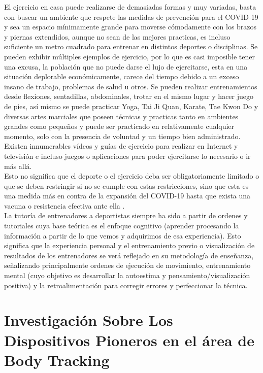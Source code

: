 El ejercicio en casa puede realizarse de demasiadas formas y muy variadas, basta con buscar un ambiente que respete las medidas de prevención para el COVID-19 y sea un espacio mínimamente grande para moverse cómodamente con los brazos y piernas extendidos, aunque no sean de las mejores practicas, es incluso suficiente un metro cuadrado para entrenar en distintos deportes o disciplinas. Se pueden exhibir múltiples ejemplos de ejercicio, por lo que es casi imposible tener una excusa, la población que no puede darse el lujo de ejercitarse, esta en una situación deplorable económicamente, carece del tiempo debido a un exceso insano de trabajo, problemas de salud u otros.
Se pueden realizar entrenamientos desde flexiones, sentadillas, abdominales, trotar en el mismo lugar y hacer juego de pies, así mismo se puede practicar Yoga, Tai Ji Quan, Karate, Tae Kwon Do y diversas artes marciales que poseen técnicas y practicas tanto en ambientes grandes como pequeños y puede ser practicado en relativamente cualquier momento, solo con la presencia de voluntad y un tiempo bien administrado. Existen innumerables vídeos y guías de ejercicio para realizar en Internet y televisión e incluso juegos o aplicaciones para poder ejercitarse lo necesario o ir más allá.\\

Esto no significa que el deporte o el ejercicio deba ser obligatoriamente limitado o que se deben restringir si no se cumple con estas restricciones, sino que esta es una medida más en contra de la expansión del COVID-19 hasta que exista una vacuna o resistencia efectiva ante ella \cite{Chen}. \\

La tutoría de entrenadores a deportistas siempre ha sido a partir de ordenes y tutoriales cuya base teórica es el enfoque cognitivo (aprender procesando la información a partir de lo que vemos y adquirimos de esa experiencia). Esto significa que la experiencia personal y el entrenamiento previo o visualización de resultados de los entrenadores se verá reflejado en su metodología de enseñanza, señalizando principalmente ordenes de ejecución de movimiento, entrenamiento mental (cuyo objetivo es desarrollar la autoestima y pensamiento/visualización positiva) y la retroalimentación para corregir errores y perfeccionar la técnica\cite{raiola2017motor}. \\
\section{Investigación Sobre Los Dispositivos Pioneros en el área de Body Tracking}

